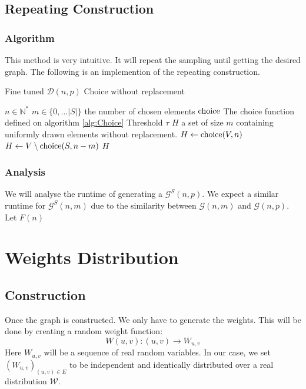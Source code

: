 \subsection{Repeating Construction}
\subsubsection{Algorithm}
This method is very intuitive. It will repeat the sampling until getting the desired graph. \newline The following is an implemention of the repeating construction.
\begin{algorithm}
	\caption{Fine tuned $\mathcal{D}(n,p)$ Choice without replacement }\label{alg:RepeatingConstruction}
	\begin{algorithmic}
		\Require $n\in\mathbb{N}^*$
		\Require $m\in\{0,\dots \lvert S \rvert\}$ the number of chosen elements
		\Require $\operatorname{choice}$ The choice function defined on algorithm \ref{alg:Choice}
		\Require Threshold $\tau$
		\Ensure $H$ a set of size $m$ containing uniformly drawn elements without replacement. 
		\State $H\leftarrow \operatorname{choice}(V,n)$
		\Else
		\State $H\leftarrow V\setminus \operatorname{choice}(S,n-m)$
		\EndIf
		\State \Return $H$
	\end{algorithmic}
\end{algorithm}

\subsubsection{Analysis}
We will analyse the runtime of generating a $\mathcal{G}^S(n,p).$
\newline We expect a similar runtime for $\mathcal{G}^S(n,m)$ due to the similarity between $\mathcal{G}(n,m)$ and $\mathcal{G}(n,p).$ 
\newline Let $F(n)$


\section{Weights Distribution}
\subsection{Construction}
Once the graph is constructed. We only have to generate the weights. \newline
This will be done by creating a random weight function:
$$
W(u,v):(u,v)\rightarrow W_{u,v}
$$
Here $W_{u,v}$ will be a sequence of real random variables. \newline
In our case, we set $(W_{u,v})_{(u,v)\in E}$ to be independent and identically distributed over a real distribution $\mathcal{W}.$ 


